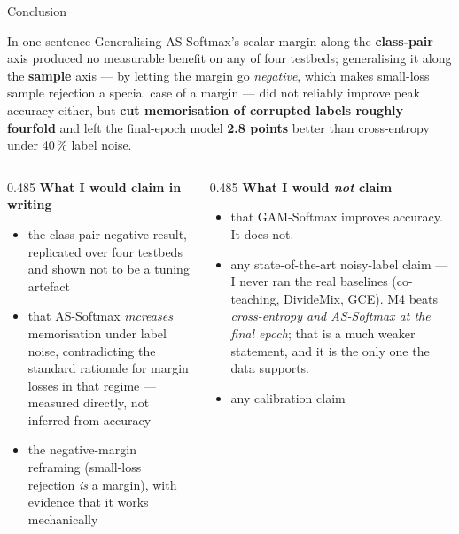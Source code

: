 \begin{frame}{Conclusion}
  \small
  \begin{block}{In one sentence}
    Generalising AS-Softmax's scalar margin along the \textbf{class-pair} axis
    produced no measurable benefit on any of four testbeds; generalising it
    along the \textbf{sample} axis --- by letting the margin go
    \emph{negative}, which makes small-loss sample rejection a special case of a
    margin --- did not reliably improve peak accuracy either, but \textbf{cut
    memorisation of corrupted labels roughly fourfold} and left the final-epoch
    model \textbf{2.8 points} better than cross-entropy under 40\,\% label noise.
  \end{block}
  \begin{columns}[T]
    \begin{column}{0.485\textwidth}
      \scriptsize
      \textbf{What I would claim in writing}
      \begin{itemize}\setlength\itemsep{0.15em}
        \item the class-pair negative result, replicated over four testbeds and
              shown not to be a tuning artefact
        \item that AS-Softmax \emph{increases} memorisation under label noise,
              contradicting the standard rationale for margin losses in that
              regime --- measured directly, not inferred from accuracy
        \item the negative-margin reframing (small-loss rejection \emph{is} a
              margin), with evidence that it works mechanically
      \end{itemize}
    \end{column}
    \begin{column}{0.485\textwidth}
      \scriptsize
      \textbf{What I would \emph{not} claim}
      \begin{itemize}\setlength\itemsep{0.15em}
        \item that GAM-Softmax improves accuracy. It does not.
        \item any state-of-the-art noisy-label claim --- I never ran the real
              baselines (co-teaching, DivideMix, GCE). M4 beats \emph{cross-entropy
              and AS-Softmax at the final epoch}; that is a much weaker statement,
              and it is the only one the data supports.
        \item any calibration claim 

\end{itemize}
\end{column}
\end{columns}
\end{frame}
